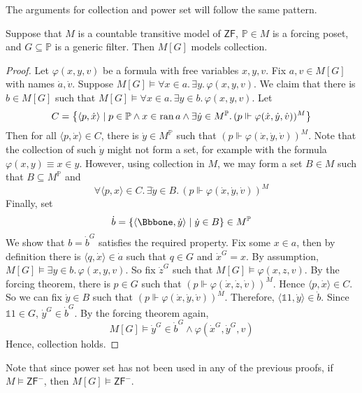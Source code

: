 The arguments for collection and power set will follow the same pattern.
\begin{lemma}
    Suppose that \( M \) is a countable transitive model of \( \mathsf{ZF} \), \( \mathbb P \in M \) is a forcing poset, and \( G \subseteq \mathbb P \) is a generic filter.
    Then \( M[G] \) models collection.
\end{lemma}
\begin{proof}
    Let \( \varphi(x, y, v) \) be a formula with free variables \( x, y, v \).
    Fix \( a, v \in M[G] \) with names \( \dot a, \dot v \).
    Suppose \( M[G] \vDash \forall x \in a.\, \exists y.\, \varphi(x, y, v) \).
    We claim that there is \( b \in M[G] \) such that \( M[G] \vDash \forall x \in a.\, \exists y \in b.\, \varphi(x, y, v) \).
    Let
    \[ C = \qty{\langle p, \dot x \rangle \mid p \in \mathbb P \wedge x \in \operatorname{ran}a \wedge \exists \dot y \in M^{\mathbb P}.\, (p \Vdash \varphi(\dot x, \dot y, \dot v))^M} \]
    Then for all \( \langle p, \dot x \rangle \in C \), there is \( \dot y \in M^{\mathbb P} \) such that \( (p \Vdash \varphi(\dot x, \dot y, \dot v))^M \).
    Note that the collection of such \( \dot y \) might not form a set, for example with the formula \( \varphi(x, y) \equiv x \in y \).
    However, using collection in \( M \), we may form a set \( B \in M \) such that \( B \subseteq M^{\mathbb P} \) and
    \[ \forall \langle p, x \rangle \in C.\, \exists \dot y \in B.\, (p \Vdash \varphi(\dot x, \dot y, \dot v))^M \]
    Finally, set
    \[ \dot b = \qty{\langle \Bbbone, \dot y \rangle \mid \dot y \in B} \in M^{\mathbb P} \]
    We show that \( b = \dot b^G \) satisfies the required property.
    Fix some \( x \in a \), then by definition there is \( \langle q, \dot x \rangle \in \dot a \) such that \( q \in G \) and \( \dot x^G = x \).
    By assumption, \( M[G] \vDash \exists y \in b.\, \varphi(x, y, v) \).
    So fix \( \dot z^G \) such that \( M[G] \vDash \varphi(x, z, v) \).
    By the forcing theorem, there is \( p \in G \) such that \( (p \Vdash \varphi(\dot x, \dot z, \dot v))^M \).
    Hence \( \langle p, \dot x \rangle \in C \).
    So we can fix \( \dot y \in B \) such that \( (p \Vdash \varphi(\dot x, \dot y, \dot v))^M \).
    Therefore, \( \langle \Bbbone 1, \dot y \rangle \in \dot b \).
    Since \( \Bbbone 1 \in G \), \( \dot y^G \in \dot b^G \).
    By the forcing theorem again,
    \[ M[G] \vDash \dot y^G \in \dot b^G \wedge \varphi(\dot x^G, \dot y^G, v) \]
    Hence, collection holds.
\end{proof}
Note that since power set has not been used in any of the previous proofs, if \( M \vDash \mathsf{ZF}^- \), then \( M[G] \vDash \mathsf{ZF}^- \).
